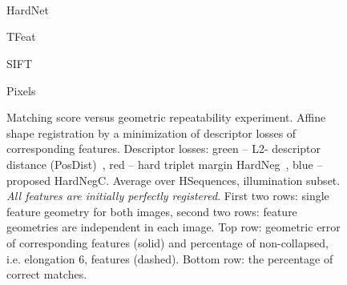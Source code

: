 \documentclass[runningheads]{llncs}
\begin{document}
\begin{figure}[htb]
\begin{minipage}[h]{0.22\linewidth}
  \\
\end{minipage}
\hfill
\begin{minipage}[h]{0.22\linewidth}
  \\
\end{minipage}
\hfill
\begin{minipage}[h]{0.22\linewidth}
  \\
\end{minipage}
\vfill \begin{minipage}[h]{0.22\linewidth}
 HardNet \\
\end{minipage}
\hfill
\begin{minipage}[h]{0.22\linewidth}
 TFeat \\
\end{minipage}
\hfill
\begin{minipage}[h]{0.22\linewidth}
 SIFT \\
\end{minipage}
\hfill
\begin{minipage}[h]{0.22\linewidth}
 Pixels  \\
\end{minipage}
  \caption{Matching score versus geometric repeatability experiment. Affine shape registration by a minimization of descriptor losses of corresponding features. Descriptor losses: green -- L2- descriptor distance (PosDist)~\cite{OriNet2016}, red -- hard triplet margin HardNeg~\cite{HardNet2017}, blue -- proposed HardNegC. Average over HSequences, illumination subset.  
\emph{All features are initially perfectly registered}. 
First two rows: single feature geometry for both images, second two rows: feature geometries are independent in each image.
Top row: geometric error of corresponding features (solid) and percentage of non-collapsed, i.e. elongation  6, features (dashed). Bottom row: the percentage of correct matches.
}
\end{figure}
\end{document}
